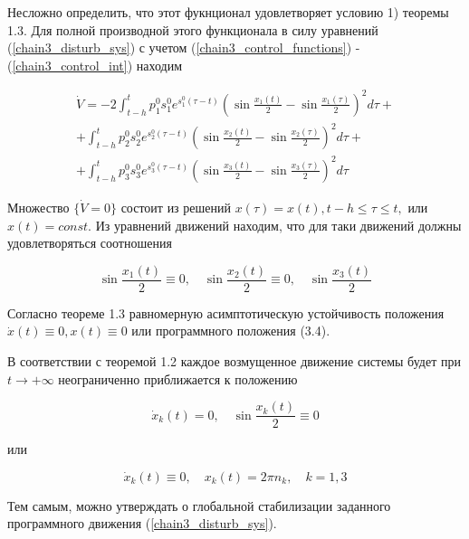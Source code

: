   Несложно определить, что этот фукнционал удовлетворяет условию 1) теоремы 1.3. Для полной производной этого функционала в силу уравнений (\ref{chain3_disturb_sys}) с учетом (\ref{chain3_control_functions}) - (\ref{chain3_control_int}) находим
  
    \begin{equation*}
    \begin{array}{l}
	\displaystyle \dot V = - 2 \int_{t - h}^{t} p_1^0 s_1^0 e^{s_1^0 (\tau - t)} \left( \sin \frac{x_1(t)}{2} - \sin \frac{x_1(\tau)}{2} \right)^2 d \tau + \\
	\displaystyle + \int_{t - h}^{t} p_2^0 s_2^0 e^{s_2^0 (\tau - t)} \left( \sin \frac{x_2(t)}{2} - \sin \frac{x_2(\tau)}{2} \right)^2 d \tau + \\ 
	\displaystyle + \int_{t - h}^{t} p_3^0 s_3^0 e^{s_3^0 (\tau - t)} \left( \sin \frac{x_3(t)}{2} - \sin \frac{x_3(\tau)}{2} \right)^2 d \tau
    \end{array}
    \end{equation*}
  
  
  Множество $\lbrace \dot V = 0 \rbrace$ состоит из решений $x(\tau) = x(t), t - h \le \tau \le t,$ или $x(t) = const.$ Из уравнений движений находим, что для таки движений должны удовлетворяться соотношения 
  
  \begin{equation*}
	\sin \frac{x_1(t)}{2} \equiv 0, \quad \sin \frac{x_2(t)}{2} \equiv 0, \quad \sin \frac{x_3(t)}{2}
  \end{equation*}
  
  Согласно теореме 1.3 равномерную асимптотическую устойчивость положения $\dot x(t) \equiv 0, x(t) \equiv 0$ или программного положения (3.4).
  
  В соответствии с теоремой 1.2 каждое возмущенное движение системы будет при $t \to + \infty$ неограниченно приближается к положению
  
  \begin{equation*}
  \dot x_k(t) = 0, \quad \sin \frac{x_k(t)}{2} \equiv 0
  \end{equation*}
  
  или
  
  \begin{equation*}
  \dot x_k (t) \equiv 0, \quad x_k(t) = 2 \pi n_k, \quad k = 1, 3
  \end{equation*} 
  
  Тем самым, можно утверждать о глобальной стабилизации заданного программного движения (\ref{chain3_disturb_sys}).
  
